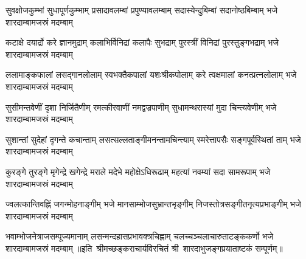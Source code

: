 

\fourlineindentedshloka
{सुवक्षोजकुम्भां सुधापूर्णकुम्भाम्}
{प्रसादावलम्बां प्रपुण्यावलम्बाम्}
{सदास्येन्दुबिम्बां सदानोष्ठबिम्बाम्}
{भजे शारदाम्बामजस्रं मदम्बाम्}

\fourlineindentedshloka
{कटाक्षे दयार्द्रो करे ज्ञानमुद्राम्}
{कलाभिर्विनिद्रां कलापैः सुभद्राम्}
{पुरस्त्रीं विनिद्रां पुरस्तुङ्गभद्राम्}
{भजे शारदाम्बामजस्रं मदम्बाम्}

\fourlineindentedshloka
{ललामाङ्कफालां लसद्गानलोलाम्}
{स्वभक्तैकपालां यशःश्रीकपोलाम्}
{करे त्वक्षमालां कनत्प्रत्नलोलाम्}
{भजे शारदाम्बामजस्रं मदम्बाम्}

\fourlineindentedshloka
{सुसीमन्तवेणीं दृशा निर्जितैणीम्}
{रमत्कीरवाणीं नमद्वज्रपाणीम्}
{सुधामन्थरास्यां मुदा चिन्त्यवेणीम्}
{भजे शारदाम्बामजस्रं मदम्बाम्}

\fourlineindentedshloka
{सुशान्तां सुदेहां दृगन्ते कचान्ताम्}
{लसत्सल्लताङ्गीमनन्तामचिन्त्याम्}
{स्मरेत्तापसैः सङ्गपूर्वस्थितां ताम्}
{भजे शारदाम्बामजस्रं मदम्बाम्}

\fourlineindentedshloka
{कुरङ्गे तुरङ्गे मृगेन्द्रे खगेन्द्रे}
{मराले मदेभे महोक्षेऽधिरूढाम्}
{महत्यां नवम्यां सदा सामरूपाम्}
{भजे शारदाम्बामजस्रं मदम्बाम्}

\fourlineindentedshloka
{ज्वलत्कान्तिवह्निं जगन्मोहनाङ्गीम्}
{भजे मानसाम्भोजसुभ्रान्तभृङ्गीम्}
{निजस्तोत्रसङ्गीतनृत्यप्रभाङ्गीम्}
{भजे शारदाम्बामजस्रं मदम्बाम्}

\fourlineindentedshloka
{भवाम्भोजनेत्राजसम्पूज्यमानाम्}
{लसन्मन्दहासप्रभावक्त्रचिह्नाम्}
{चलच्चञ्चलाचारुताटङ्ककर्णो}
{भजे शारदाम्बामजस्रं मदम्बाम्}
॥इति~श्रीमच्छङ्कराचार्यविरचितं श्री~शारदाभुजङ्गप्रयाताष्टकं सम्पूर्णम्॥